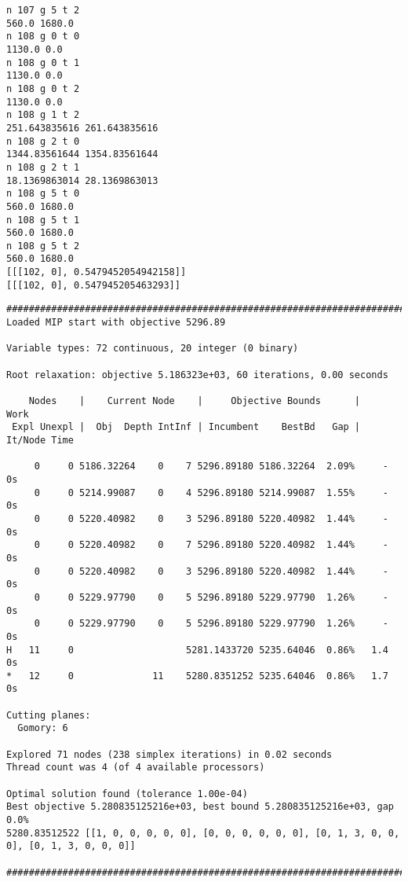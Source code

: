 \documentclass[10pt]{article}
\theoremstyle{plain}
\theoremstyle{definition}
\theoremstyle{remark}
\begin{document}
\begin{minipage}[t]{4.2cm}
\tiny\begin{verbatim}
n 107 g 5 t 2
560.0 1680.0
n 108 g 0 t 0
1130.0 0.0
n 108 g 0 t 1
1130.0 0.0
n 108 g 0 t 2
1130.0 0.0
n 108 g 1 t 2
251.643835616 261.643835616
n 108 g 2 t 0
1344.83561644 1354.83561644
n 108 g 2 t 1
18.1369863014 28.1369863013
n 108 g 5 t 0
560.0 1680.0
n 108 g 5 t 1
560.0 1680.0
n 108 g 5 t 2
560.0 1680.0
[[[102, 0], 0.5479452054942158]]
[[[102, 0], 0.547945205463293]]
\end{verbatim}
\end{minipage}

\begin{minipage}[t]{8cm}
\tiny\begin{verbatim}
####################################################################################
Loaded MIP start with objective 5296.89

Variable types: 72 continuous, 20 integer (0 binary)

Root relaxation: objective 5.186323e+03, 60 iterations, 0.00 seconds

    Nodes    |    Current Node    |     Objective Bounds      |     Work
 Expl Unexpl |  Obj  Depth IntInf | Incumbent    BestBd   Gap | It/Node Time

     0     0 5186.32264    0    7 5296.89180 5186.32264  2.09%     -    0s
     0     0 5214.99087    0    4 5296.89180 5214.99087  1.55%     -    0s
     0     0 5220.40982    0    3 5296.89180 5220.40982  1.44%     -    0s
     0     0 5220.40982    0    7 5296.89180 5220.40982  1.44%     -    0s
     0     0 5220.40982    0    3 5296.89180 5220.40982  1.44%     -    0s
     0     0 5229.97790    0    5 5296.89180 5229.97790  1.26%     -    0s
     0     0 5229.97790    0    5 5296.89180 5229.97790  1.26%     -    0s
H   11     0                    5281.1433720 5235.64046  0.86%   1.4    0s
*   12     0              11    5280.8351252 5235.64046  0.86%   1.7    0s

Cutting planes:
  Gomory: 6

Explored 71 nodes (238 simplex iterations) in 0.02 seconds
Thread count was 4 (of 4 available processors)

Optimal solution found (tolerance 1.00e-04)
Best objective 5.280835125216e+03, best bound 5.280835125216e+03, gap 0.0%
5280.83512522 [[1, 0, 0, 0, 0, 0], [0, 0, 0, 0, 0, 0], [0, 1, 3, 0, 0, 0], [0, 1, 3, 0, 0, 0]]

####################################################################################
\end{verbatim}
\end{minipage}
\end{document}
